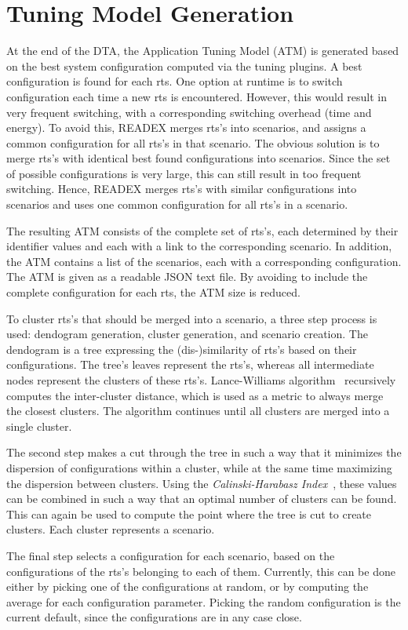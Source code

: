 \section{Tuning Model Generation} \label{tm-generation}

At the end of the DTA, the Application Tuning Model (ATM) is generated based on the best system configuration computed via the tuning plugins. A best configuration is found for each rts. One option at runtime is to switch configuration each time a new rts is encountered. However, this would result in very frequent switching, with a 
corresponding switching overhead (time and energy). To avoid this, READEX merges rts's into scenarios, and assigns a common configuration for all rts's in that scenario. The obvious solution is to merge rts's with identical best found configurations into scenarios. Since the set of possible configurations is very large, this can still result in too frequent switching. Hence, READEX merges rts's with similar configurations into scenarios and uses one common configuration for all rts's in a scenario.

The resulting ATM consists of the complete set of rts's, each determined by their 
identifier values and each with a link to the corresponding scenario. In 
addition, the ATM contains a list of the scenarios, each with a corresponding 
configuration. The ATM is given as a readable JSON text file. By avoiding to 
include the complete configuration for each rts, the ATM size is reduced. 

To cluster rts's that should be merged into a scenario, a three step process is 
used: dendogram generation, cluster generation, and scenario creation. The 
dendogram is a tree expressing the (dis-)similarity of rts's based on their 
configurations. The tree's leaves represent the rts's, whereas all intermediate 
nodes represent the clusters of these rts's. Lance-Williams algorithm~
\cite{Lance1967} recursively computes the inter-cluster distance, which is used 
as a metric to always merge the closest clusters. The algorithm continues until 
all clusters are merged into a single cluster. 

The second step makes a cut through the tree in such a way that it minimizes the dispersion of configurations within a cluster, while at the same time maximizing the dispersion between clusters. Using the \emph{Calinski-Harabasz Index}~\cite{Calinski1974}, these values can be combined in such a way that an optimal number of clusters can be found. This can again be used to compute the point where the tree is cut to create clusters. Each cluster represents a scenario.

The final step selects a configuration for each scenario, based on the 
configurations of the rts's belonging to each of them. Currently, this can be 
done either by picking one of the configurations at random, or by computing the 
average for each configuration parameter. Picking the random configuration is 
the current default, since the configurations are in any case close.